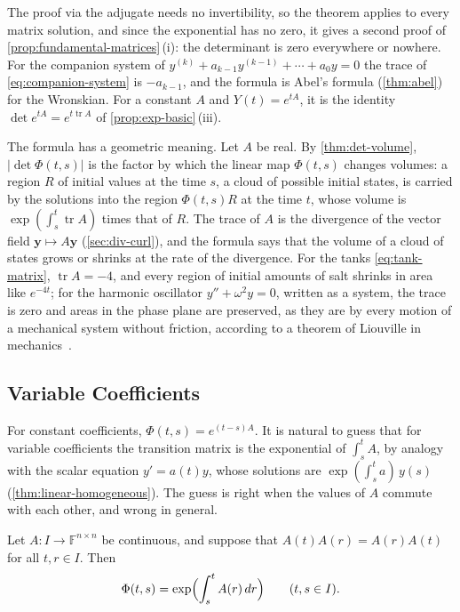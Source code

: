 The proof via the adjugate needs no invertibility, so the theorem applies to every matrix solution, and since the exponential has no zero, it gives a second proof of \cref{prop:fundamental-matrices}\,(i): the determinant is zero everywhere or nowhere. For the companion system of $y^{(k)}+a_{k-1}y^{(k-1)}+\cdots+a_0y=0$ the trace of \eqref{eq:companion-system} is $-a_{k-1}$, and the formula is Abel's formula (\cref{thm:abel}) for the Wronskian. For a constant $A$ and $Y(t)=e^{tA}$, it is the identity $\det e^{tA}=e^{t\operatorname{tr}A}$ of \cref{prop:exp-basic}\,(iii).

The formula has a geometric meaning. Let $A$ be real. By \cref{thm:det-volume}, $|\det\Phi(t,s)|$ is the factor by which the linear map $\Phi(t,s)$ changes volumes: a region $R$ of initial values at the time $s$, a cloud of possible initial states, is carried by the solutions into the region $\Phi(t,s)R$ at the time $t$, whose volume is $\exp(\int_s^t\operatorname{tr}A)$ times that of $R$. The trace of $A$ is the divergence of the vector field $\mathbf y\mapsto A\mathbf y$ (\cref{sec:div-curl}), and the formula says that the volume of a cloud of states grows or shrinks at the rate of the divergence. For the tanks \eqref{eq:tank-matrix}, $\operatorname{tr}A=-4$, and every region of initial amounts of salt shrinks in area like $e^{-4t}$; for the harmonic oscillator $y''+\omega^2y=0$, written as a system, the trace is zero and areas in the phase plane are preserved, as they are by every motion of a mechanical system without friction, according to a theorem of Liouville in mechanics~\cite[Sect.~16]{arnold1989}.

\subsection{Variable Coefficients}

For constant coefficients, $\Phi(t,s)=e^{(t-s)A}$. It is natural to guess that for variable coefficients the transition matrix is the exponential of $\int_s^tA$, by analogy with the scalar equation $y'=a(t)y$, whose solutions are $\exp(\int_s^ta)\,y(s)$ (\cref{thm:linear-homogeneous}). The guess is right when the values of $A$ commute with each other, and wrong in general.

\begin{proposition}
\label{prop:commuting-coefficients}
Let $A\colon I\to\mathbb F^{n\times n}$ be continuous, and suppose that $A(t)A(r)=A(r)A(t)$ for all $t,r\in I$. Then
\[
\Phi(t,s)=\exp\Bigl(\int_s^tA(r)\,dr\Bigr)\qquad(t,s\in I).
\]
\end{proposition}

